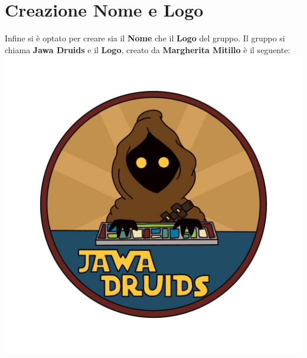 \documentclass[a4paper,12pt]{report}
\begin{document}
	\chapter{Creazione Nome e Logo}
	Infine si è optato per creare sia il \textbf{Nome} che il \textbf{Logo} del gruppo.
	Il gruppo si chiama \textbf{Jawa Druids} e il \textbf{Logo}, creato da \textbf{Margherita Mitillo} è il seguente:\\
	\includegraphics[width=0.5\linewidth]{../../immagini/DRUIDSLOGO.jpg}\\[4ex]
\end{document}
